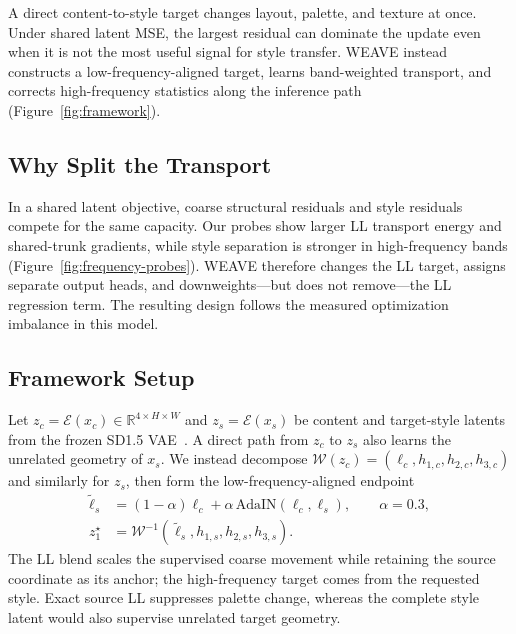 \documentclass[letterpaper]{article}
\begin{document}
A direct content-to-style target changes layout, palette, and texture at once. Under shared
latent MSE, the largest residual can dominate the update even when it is not the most useful
signal for style transfer. WEAVE instead constructs a low-frequency-aligned target, learns
band-weighted transport, and corrects high-frequency statistics along the inference path
(Figure~\ref{fig:framework}).

\subsection{Why Split the Transport}
\label{sec:mechanism}

In a shared latent objective, coarse structural residuals and style residuals compete for the
same capacity. Our probes show larger LL transport energy and shared-trunk gradients, while
style separation is stronger in high-frequency bands (Figure~\ref{fig:frequency-probes}).
WEAVE therefore changes the LL target, assigns separate output heads, and downweights---but
does not remove---the LL regression term. The resulting design follows the measured
optimization imbalance in this model.





\subsection{Framework Setup}
\label{sec:framework}

Let $z_c=\mathcal E(x_c)\in\mathbb R^{4\times H\times W}$ and
$z_s=\mathcal E(x_s)$ be content and target-style latents from the frozen SD1.5
VAE~\cite{rombach2022high}. A direct path from $z_c$ to $z_s$ also learns the unrelated
geometry of $x_s$. We instead decompose
$\mathcal W(z_c)=(\ell_c,h_{1,c},h_{2,c},h_{3,c})$ and similarly for $z_s$, then form
the low-frequency-aligned endpoint
\begin{equation}
\begin{aligned}
\tilde\ell_s &=(1-\alpha)\ell_c+
\alpha\,\mathrm{AdaIN}(\ell_c,\ell_s),\qquad \alpha=0.3,\\
z_1^\star&=\mathcal W^{-1}(\tilde\ell_s,h_{1,s},h_{2,s},h_{3,s}).
\end{aligned}
\label{eq:aligned-target}
\end{equation}
The LL blend scales the supervised coarse movement while retaining the source coordinate as
its anchor; the high-frequency target comes from the requested style. Exact source LL suppresses palette
change, whereas the complete style latent would also supervise unrelated target geometry.
\end{document}
